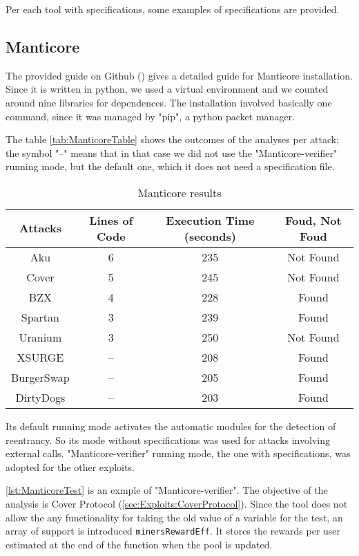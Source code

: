 Per each tool with specifications, some examples of specifications are provided.

\subsection*{Manticore} The provided guide on Github (\cite{ManticoreGitHub}) gives a detailed guide for Manticore installation.
Since it is written in python, we used a virtual environment and we counted around nine libraries for dependences.
The installation involved basically one command, since it was managed by "pip", a python packet manager.

The table \autoref*{tab:ManticoreTable} shows the outcomes of the analyses per attack; the symbol "--" means that in that case we did not use the
"Manticore-verifier" running mode, but the default one, which it does not need a specification file.

\begin{center}
\begin{table*}
    \caption{Manticore results}
        \label{tab:ManticoreTable}
        \begin{tabular}{cccc}
        \toprule
            Attacks & Lines of Code & Execution Time (seconds) & Foud, Not Foud\\
            \midrule
            Aku & 6 & 235  & Not Found \\ 
            Cover & 5 & 245 & Not Found \\ 
            BZX  & 4 & 228 & Found \\ 
            Spartan & 3 & 239 & Found \\ 
            Uranium  & 3 & 250 & Not Found \\ 
            XSURGE & -- & 208 & Found \\ 
            BurgerSwap  &  -- & 205 & Found\\ 
            DirtyDogs & -- & 203 & Found \\
        \bottomrule
    \end{tabular}
\end{table*}
\end{center}

Its default running mode activates the automatic modules for the detection of reentrancy. So its mode without specifications was used for attacks involving external calls.
"Manticore-verifier" running mode, the one with specifications, was adopted for the other exploits. 

\autoref*{lst:ManticoreTest} is an exmple of "Manticore-verifier". 
The objective of the analysis is Cover Protocol (\autoref*{sec:Exploits:CoverProtocol}). 
Since the tool does not allow the any functionality for taking the old value of a variable for the test, an array of support is introduced \texttt{minersRewardEff}. 
It stores the rewards per user estimated at the end of the function when the pool is updated.

